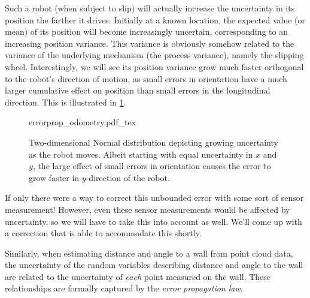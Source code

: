 Such a robot (when subject to slip) will actually increase the uncertainty in its position the farther it drives. Initially at a known location, the expected value (or mean) of its position will become increasingly uncertain, corresponding to an increasing position variance. This variance is obviously somehow related to the variance of the underlying mechanism (the process variance), namely the slipping wheel. Interestingly, we will see its position variance grow much faster orthogonal to the robot's direction of motion, as small errors in orientation have a much larger cumulative effect on position than small errors in the longitudinal direction. This is illustrated in \cref{fig:errorprop_odometry}.

\begin{figure}
	\centering
    \def\svgwidth{\textwidth}
    {errorprop_odometry.pdf_tex}
	\caption{Two-dimensional Normal distribution depicting growing uncertainty as the robot moves. Albeit starting with equal
    uncertainty in $x$ and $y$, the large effect of small errors in orientation causes the error to grow faster in $y$-direction of the robot.}
	\label{fig:errorprop_odometry}
\end{figure}

If only there were a way to correct this unbounded error with some sort of sensor measurement! However, even these sensor measurements would be affected by uncertainty, so we will have to take this into account as well. We'll come up with a correction that is able to accommodate this shortly.

Similarly, when estimating distance and angle to a wall from point cloud data, the uncertainty of the random variables describing distance and angle to the wall are related to the uncertainty of \textsl{each} point measured on the wall. These relationships are formally captured by the \textsl{error propagation law}.

